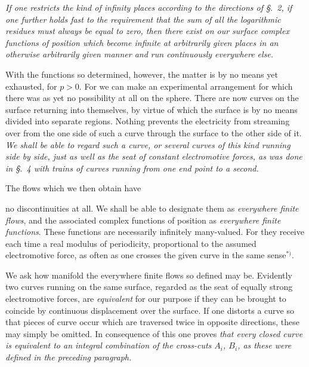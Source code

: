 \documentclass{article}
\begin{document}
\emph{If one restricts the kind of infinity places according to the directions of §.~2, if one further holds fast to the requirement that the sum of all the logarithmic residues must always be equal to zero, then there exist on our surface complex functions of position which become infinite at arbitrarily given places in an otherwise arbitrarily given manner and run continuously everywhere else.}

With the functions so determined, however, the matter is by no means yet exhausted, for $p > 0$. For we can make an experimental arrangement for which there was as yet no possibility at all on the sphere. There are now curves on the surface returning into themselves, by virtue of which the surface is by no means divided into separate regions. Nothing prevents the electricity from streaming over from the one side of such a curve through the surface to the other side of it. \emph{We shall be able to regard such a curve, or several curves of this kind running side by side, just as well as the seat of constant electromotive forces, as was done in §.~4 with trains of curves running from one end point to a second.}

The flows which we then obtain have

no discontinuities at all. We shall be able to designate them as \emph{everywhere finite flows}, and the associated complex functions of position as \emph{everywhere finite functions}. These functions are necessarily infinitely many-valued. For they receive each time a real modulus of periodicity, proportional to the assumed electromotive force, as often as one crosses the given curve in the same sense${}^{*)}$.

We ask how manifold the everywhere finite flows so defined may be. Evidently two curves running on the same surface, regarded as the seat of equally strong electromotive forces, are \emph{equivalent} for our purpose if they can be brought to coincide by continuous displacement over the surface. If one distorts a curve so that pieces of curve occur which are traversed twice in opposite directions, these may simply be omitted. In consequence of this one proves \emph{that every closed curve is equivalent to an integral combination of the cross-cuts $A_{i}$, $B_{i}$, as these were defined in the preceding paragraph.}

\end{document}
